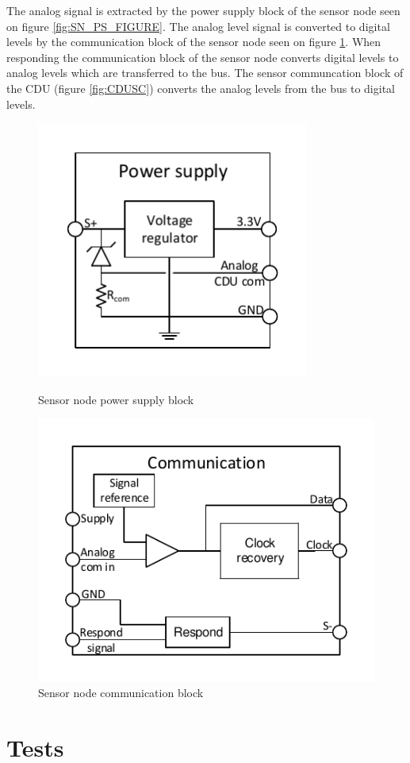 The analog signal is extracted by the power supply block of the sensor node seen on figure \ref{fig:SN_PS_FIGURE}. The analog level signal is converted to digital levels by the communication block of the sensor node seen on figure \ref{fig:SN_com_fig}. When responding the communication block of the sensor node converts digital levels to analog levels which are transferred to the bus. The sensor communcation block of the CDU (figure \ref{fig:CDUSC}) converts the analog levels from the bus to digital levels. 
\begin{figure}[H]
	\begin{minipage}[b]{0.45\linewidth}
	\centering
	\includegraphics[width=0.8\textwidth]{billeder/11ProjectDescription/powersupply_detailed_sn}
	\caption{Sensor node power supply block}
	\label{fig:SN_PS_FIGURE}
	\end{minipage}
	\begin{minipage}[b]{0.45\linewidth}
	\centering
	\includegraphics[width=1\textwidth]{billeder/11ProjectDescription/communication_sn}
	\caption{Sensor node communication block}
	\label{fig:SN_com_fig}
	\end{minipage}
\end{figure} 
\section{Tests}
